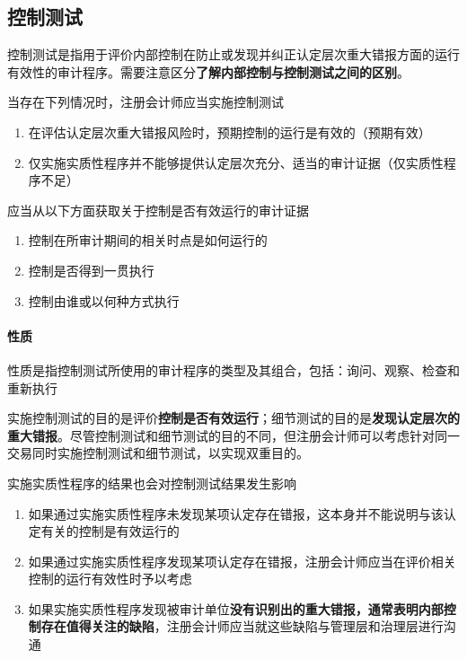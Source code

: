 \documentclass[UTF8,12pt]{ctexart}
\numberwithin{equation}{section} %
\numberwithin{figure}{section}
\numberwithin{table}{section}
\begin{document}
	\subsection{控制测试}
	控制测试是指用于评价内部控制在防止或发现并纠正认定层次重大错报方面的运行有效性的审计程序。需要注意区分\textbf{了解内部控制与控制测试之间的区别}。
	
	当存在下列情况时，注册会计师应当实施控制测试
	\begin{enumerate}
		\item 在评估认定层次重大错报风险时，预期控制的运行是有效的（预期有效）
		
		\item 仅实施实质性程序并不能够提供认定层次充分、适当的审计证据（仅实质性程序不足）
	\end{enumerate}
	
	应当从以下方面获取关于控制是否有效运行的审计证据
	\begin{enumerate}
		\item 控制在所审计期间的相关时点是如何运行的
		
		\item 控制是否得到一贯执行
		
		\item 控制由谁或以何种方式执行
	\end{enumerate}
	
	\paragraph{性质}
	性质是指控制测试所使用的审计程序的类型及其组合，包括：询问、观察、检查和重新执行
	
	实施控制测试的目的是评价\textbf{控制是否有效运行}；细节测试的目的是\textbf{发现认定层次的重大错报}。尽管控制测试和细节测试的目的不同，但注册会计师可以考虑针对同一交易同时实施控制测试和细节测试，以实现双重目的。
	
	实施实质性程序的结果也会对控制测试结果发生影响
	\begin{enumerate}
		\item 如果通过实施实质性程序未发现某项认定存在错报，这本身并不能说明与该认定有关的控制是有效运行的
		
		\item 如果通过实施实质性程序发现某项认定存在错报，注册会计师应当在评价相关控制的运行有效性时予以考虑
		
		\item 如果实施实质性程序发现被审计单位\textbf{没有识别出的重大错报，通常表明内部控制存在值得关注的缺陷}，注册会计师应当就这些缺陷与管理层和治理层进行沟通
	\end{enumerate}
	
\end{document}
